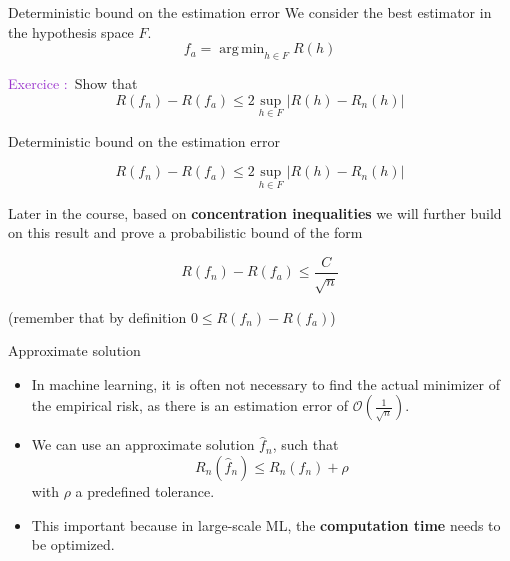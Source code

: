 \documentclass[usenames,dvipsnames]{beamer}
\DeclareMathOperator*{\argmin}{arg\,min}
\newcounter{numexos}%
\newcommand{\exercice}[1]{%
\addtocounter{numexos}{1}%
\textcolor{DarkOrchid}{Exercice\,\thenumexos\,:}\,#1%
}
\begin{document}
\begin{frame}{Deterministic bound on the estimation error}
We consider the best estimator in the hypothesis space $F$.
    \begin{equation*}
	f_a = \argmin_{h\in F}R(h)
    \end{equation*}

    \exercice{} Show that
    \begin{equation}
	R( f_n)-R(f_a) \leq 2 \sup_{h\in F}|R(h)-R_n(h)|
    \end{equation}
\end{frame}

\begin{frame}{Deterministic bound on the estimation error}

    \begin{equation}
	R( f_n)-R(f_a)\leq 2 \sup_{h\in F}|R(h)-R_n(h)|
    \end{equation}

   Later in the course, based on \textbf{{concentration inequalities }} we will further build on this result and prove a probabilistic bound of the form

    \begin{equation}
	R( f_n)-R(f_a)\leq \frac{C}{ \sqrt{n} } 
    \end{equation}

    (remember that by definition $0 \leq R( f_n)-R(f_a)$)

\end{frame}

\begin{frame}{Approximate solution}

    \begin{itemize}
        \item In machine learning, it is often not necessary to find the actual
            minimizer of the empirical risk, as there is an estimation error of $ \mathcal{O} ( \frac{1}{ \sqrt{n} }) $. \cite[]{Bottou2009}
        \item We can use an approximate solution $ \hat{f}_n$, such that 
            \begin{equation}
                R_n( \hat{f}_n)\leq R_n(f_n)+\rho
            \end{equation}
            with $\rho$ a predefined tolerance.
        \item This important because in large-scale ML, the \textbf{{computation time}} needs to be optimized.
    \end{itemize}
\end{frame}
\end{document}

